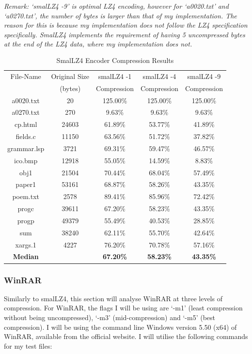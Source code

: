 \documentclass[12pt]{article}
\begin{document}
\emph{Remark: `smalLZ4 -9' is optimal LZ4 encoding, however for `a0020.txt' and `a0270.txt', the number of bytes is larger than that of my implementation. The reason for this is because my implementation does not follow the LZ4 specification specifically. SmalLZ4 implements the requirement of having 5 uncompressed bytes at the end of the LZ4 data, where my implementation does not.}

\begin{table}[H]
	\centering
	\begin{tabular}{| c | c | c | c | c |} 
		\hline
		File-Name & Original Size & smalLZ4 -1 & smalLZ4 -4 & smalLZ4 -9 \\
		& (bytes) & Compression & Compression & Compression\\
		\hline
		a0020.txt & 20 & 125.00\% & 125.00\% & 125.00\%\\
		\hline
		a0270.txt & 270 & 9.63\% & 9.63\% & 9.63\%\\
		\hline
		cp.html & 24603 & 61.89\% & 53.77\% & 41.89\%\\
		\hline
		fields.c & 11150 & 63.56\% & 51.72\% & 37.82\%\\
		\hline
		grammar.lsp & 3721 & 69.31\% & 59.47\% & 46.57\%\\
		\hline
		ico.bmp & 12918 & 55.05\% & 14.59\% & 8.83\%\\
		\hline
		obj1 & 21504 & 70.44\% & 68.04\% & 57.49\%\\
		\hline
		paper1 & 53161 & 68.87\% & 58.26\% & 43.35\%\\
		\hline
		poem.txt & 2578 & 89.41\% & 85.96\% & 72.42\%\\
		\hline
		progc & 39611 & 67.20\% & 58.23\% & 43.35\%\\
		\hline
		progp & 49379 & 55.49\% & 40.53\% & 28.85\%\\
		\hline
		sum & 38240 & 62.11\% & 55.70\% & 42.64\%\\
		\hline
		xargs.1 & 4227 & 76.20\% & 70.78\% & 57.16\%\\
		\Xhline{3\arrayrulewidth}
		\textbf{Median} & & \textbf{67.20\%} & \textbf{58.23\%} & \textbf{43.35\%}\\
		\hline
	\end{tabular}
	\caption{SmalLZ4 Encoder Compression Results}
	\label{smallz4_results_compression}
\end{table}

\subsubsection{WinRAR}
Similarly to smalLZ4, this section will analyse WinRAR at three levels of compression. For WinRAR, the flags I will be using are `-m1' (least compression without being uncompressed), `-m3' (mid-compression) and `-m5' (best compression). I will be using the command line Windows version 5.50 (x64) of WinRAR, available from the official website. I will utilise the following commands for my test files:
\end{document}
